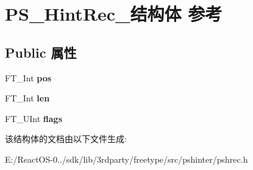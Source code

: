 \hypertarget{struct_p_s___hint_rec__}{}\section{P\+S\+\_\+\+Hint\+Rec\+\_\+结构体 参考}
\label{struct_p_s___hint_rec__}
\subsection*{Public 属性}
\begin{DoxyCompactItemize}
\item 
\mbox{\label{struct_p_s___hint_rec___aa305174ac84edf8969f55503ff37bf47}} 
F\+T\+\_\+\+Int {\bfseries pos}
\item 
\mbox{\label{struct_p_s___hint_rec___a439783f07fbb601905414e5cf8e2db43}} 
F\+T\+\_\+\+Int {\bfseries len}
\item 
\mbox{\label{struct_p_s___hint_rec___a664a654ae41b4cd4c4fb387be4cad72c}} 
F\+T\+\_\+\+U\+Int {\bfseries flags}
\end{DoxyCompactItemize}


该结构体的文档由以下文件生成\+:\begin{DoxyCompactItemize}
\item 
E\+:/\+React\+O\+S-\/0../sdk/lib/3rdparty/freetype/src/pshinter/pshrec.\+h\end{DoxyCompactItemize}
